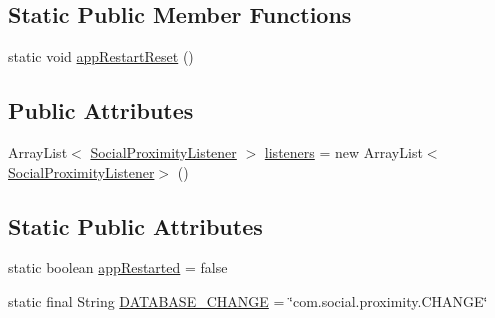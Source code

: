 \subsection*{Static Public Member Functions}
\begin{DoxyCompactItemize}
\item 
static void \hyperlink{classcom_1_1copelabs_1_1oiframework_1_1socialproximity_1_1_social_proximity_a4c9ca53cd14a201a223448587ae7226b}{app\+Restart\+Reset} ()
\end{DoxyCompactItemize}
\subsection*{Public Attributes}
\begin{DoxyCompactItemize}
\item 
Array\+List$<$ \hyperlink{interfacecom_1_1copelabs_1_1oiframework_1_1socialproximity_1_1_social_proximity_listener}{Social\+Proximity\+Listener} $>$ \hyperlink{classcom_1_1copelabs_1_1oiframework_1_1socialproximity_1_1_social_proximity_a4ec558c34eab752dcdba50353abda087}{listeners} = new Array\+List$<$\hyperlink{interfacecom_1_1copelabs_1_1oiframework_1_1socialproximity_1_1_social_proximity_listener}{Social\+Proximity\+Listener}$>$ ()
\end{DoxyCompactItemize}
\subsection*{Static Public Attributes}
\begin{DoxyCompactItemize}
\item 
static boolean \hyperlink{classcom_1_1copelabs_1_1oiframework_1_1socialproximity_1_1_social_proximity_af0e91e09326579538ac201abf8c20e3d}{app\+Restarted} = false
\item 
static final String \hyperlink{classcom_1_1copelabs_1_1oiframework_1_1socialproximity_1_1_social_proximity_a78ea4ded379b6e5575b1a58e7559afef}{D\+A\+T\+A\+B\+A\+S\+E\+\_\+\+C\+H\+A\+N\+G\+E} = \char`\"{}com.\+social.\+proximity.\+C\+H\+A\+N\+G\+E\char`\"{}
\end{DoxyCompactItemize}

